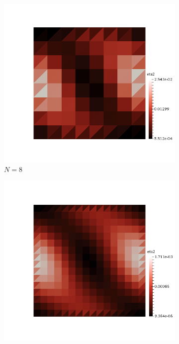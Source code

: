 \clearpage

\begin{figure}[h!]
  \centering
  \begin{subfigure}[b]{0.24\textwidth}
    \includegraphics[width=\textwidth,height=\textheight,keepaspectratio,height=\textheight,keepaspectratio]{figures/1_mpet/space/eta2_8.png}
    \caption{$N=8$}
  \end{subfigure}
  \begin{subfigure}[b]{0.24\textwidth}
    \includegraphics[width=\textwidth,height=\textheight,keepaspectratio,height=\textheight,keepaspectratio]{figures/1_mpet/space/eta2_16.png}

\end{subfigure}
\end{figure}
